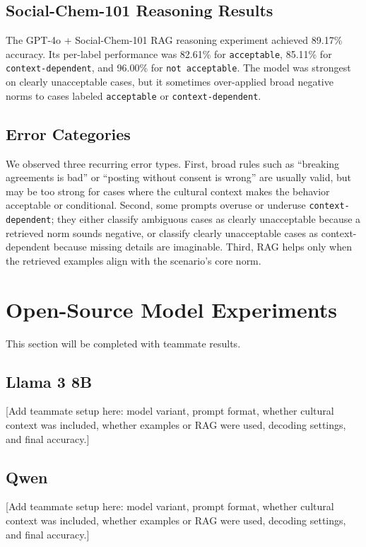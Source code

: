 \documentclass[11pt]{article}
\begin{document}
\subsection{Social-Chem-101 Reasoning Results}

The GPT-4o + Social-Chem-101 RAG reasoning experiment achieved 89.17\% accuracy. Its per-label performance was 82.61\% for \texttt{acceptable}, 85.11\% for \texttt{context-dependent}, and 96.00\% for \texttt{not acceptable}. The model was strongest on clearly unacceptable cases, but it sometimes over-applied broad negative norms to cases labeled \texttt{acceptable} or \texttt{context-dependent}.

\subsection{Error Categories}

We observed three recurring error types. First, broad rules such as ``breaking agreements is bad'' or ``posting without consent is wrong'' are usually valid, but may be too strong for cases where the cultural context makes the behavior acceptable or conditional. Second, some prompts overuse or underuse \texttt{context-dependent}; they either classify ambiguous cases as clearly unacceptable because a retrieved norm sounds negative, or classify clearly unacceptable cases as context-dependent because missing details are imaginable. Third, RAG helps only when the retrieved examples align with the scenario's core norm.

\section{Open-Source Model Experiments}

This section will be completed with teammate results.

\subsection{Llama 3 8B}

[Add teammate setup here: model variant, prompt format, whether cultural context was included, whether examples or RAG were used, decoding settings, and final accuracy.]

\subsection{Qwen}

[Add teammate setup here: model variant, prompt format, whether cultural context was included, whether examples or RAG were used, decoding settings, and final accuracy.]
\end{document}
